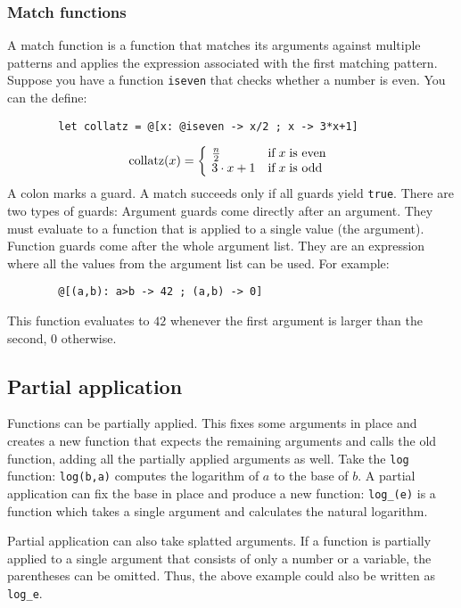 \documentclass[10pt]{article}
\begin{document}
    \subsubsection{Match functions}
    A match function is a function that matches its arguments against multiple patterns and applies the expression associated with the first matching pattern.
    Suppose you have a function \verb|iseven| that checks whether a number is even.
    You can the define:
    \begin{verbatim}
        let collatz = @[x: @iseven -> x/2 ; x -> 3*x+1]
    \end{verbatim}
    \[
        \mathrm{collatz}(x) = \left\{\kern-\nulldelimiterspace\begin{array}{ll}
            \frac{n}{2}   & \textrm{if}\;x\;\textrm{is even} \\
            3 \cdot x + 1 & \textrm{if}\;x\;\textrm{is odd}
        \end{array} \right.
    \]
    A colon marks a guard.
    A match succeeds only if all guards yield \verb|true|.
    There are two types of guards: Argument guards come directly after an argument.
    They must evaluate to a function that is applied to a single value (the argument).
    Function guards come after the whole argument list.
    They are an expression where all the values from the argument list can be used.
    For example:
    \begin{verbatim}
        @[(a,b): a>b -> 42 ; (a,b) -> 0]
    \end{verbatim}
    This function evaluates to $ 42 $ whenever the first argument is larger than the second, $ 0 $ otherwise.
    
    \subsection{Partial application}\label{subsec:partial-application}
    Functions can be partially applied.
    This fixes some arguments in place and creates a new function that expects the remaining arguments and calls the old function, adding all the partially applied arguments as well.
    Take the \verb|log| function: \verb|log(b,a)| computes the logarithm of $ a $ to the base of $ b $.
    A partial application can fix the base in place and produce a new function:
    \verb|log_(e)| is a function which takes a single argument and calculates the natural logarithm.
    
    Partial application can also take splatted arguments.
    If a function is partially applied to a single argument that consists of only a number or a variable, the parentheses can be omitted.
    Thus, the above example could also be written as \verb|log_e|.
    
\end{document}
